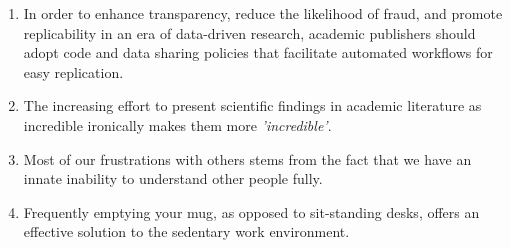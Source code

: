 \documentclass[a5paper]{article}
\begin{document}
\begin{enumerate}

  \item In order to enhance transparency, reduce the likelihood of fraud, and promote replicability in an era of data-driven research, academic publishers should adopt code and data sharing policies that facilitate automated workflows for easy replication.



  \item The increasing effort to present scientific findings in academic literature as incredible ironically makes them more \textit{'incredible'}.

  
  \item Most of our frustrations with others stems from the fact that we have an innate inability to understand other people fully.

  \item Frequently emptying your mug, as opposed to sit-standing desks, offers an effective solution to the sedentary work environment.


\end{enumerate}
\end{document}
